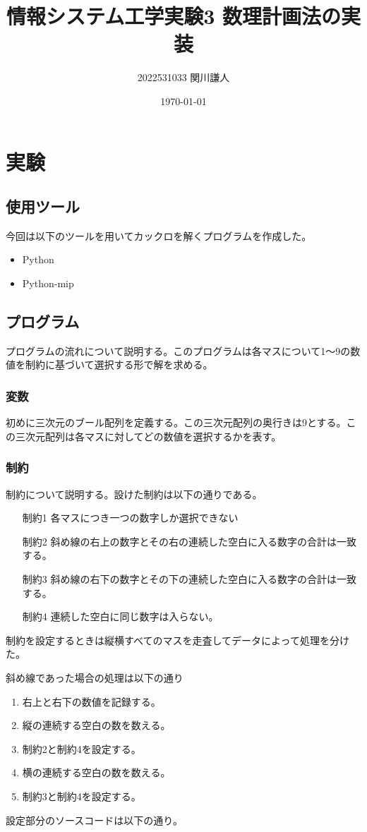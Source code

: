 \documentclass[a4paper,titlepage,11pt]{ltjsarticle}
\begin{document}
\title{情報システム工学実験3 数理計画法の実装}
\author{2022531033 関川謙人}
\date{\today}
\maketitle

\section{実験}
\subsection{使用ツール}
今回は以下のツールを用いてカックロを解くプログラムを作成した。
\begin{itemize}
    \item Python
    \item Python-mip
\end{itemize}
\subsection{プログラム}
プログラムの流れについて説明する。このプログラムは各マスについて1～9の数値を制約に基づいて選択する形で解を求める。

\subsubsection{変数}
初めに三次元のブール配列を定義する。この三次元配列の奥行きは9とする。この三次元配列は各マスに対してどの数値を選択するかを表す。

\subsubsection{制約}
制約について説明する。設けた制約は以下の通りである。
\begin{enumerate}
  \item[制約1] 各マスにつき一つの数字しか選択できない
  \item[制約2] 斜め線の右上の数字とその右の連続した空白に入る数字の合計は一致する。
  \item[制約3] 斜め線の右下の数字とその下の連続した空白に入る数字の合計は一致する。
  \item[制約4] 連続した空白に同じ数字は入らない。
\end{enumerate}
制約を設定するときは縦横すべてのマスを走査してデータによって処理を分けた。

斜め線であった場合の処理は以下の通り
\begin{enumerate}
  \item 右上と右下の数値を記録する。
  \item 縦の連続する空白の数を数える。
  \item 制約2と制約4を設定する。
  \item 横の連続する空白の数を数える。
  \item 制約3と制約4を設定する。
\end{enumerate}
設定部分のソースコードは以下の通り。
\end{document}

